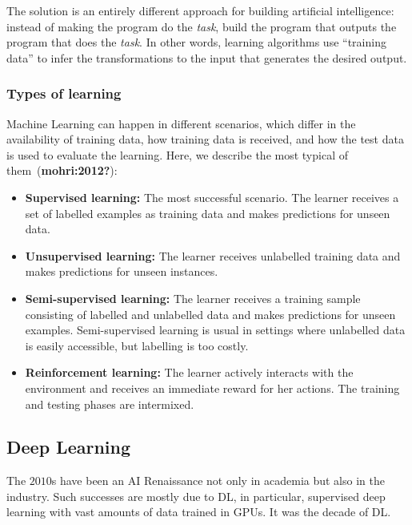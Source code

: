 \documentclass[
  letterpaper,
  DIV=11,
  numbers=noendperiod,
  oneside]{scrreprt}
\begin{document}
The solution is an entirely different approach for building artificial
intelligence: instead of making the program do the \emph{task}, build
the program that outputs the program that does the \emph{task}. In other
words, learning algorithms use ``training data'' to infer the
transformations to the input that generates the desired output.

\hypertarget{types-of-learning}{%
\subsubsection{Types of learning}\label{types-of-learning}}

Machine Learning can happen in different scenarios, which differ in the
availability of training data, how training data is received, and how
the test data is used to evaluate the learning. Here, we describe the
most typical of them~(\textbf{mohri:2012?}):

\begin{itemize}
\item
  \textbf{Supervised learning:} The most successful scenario. The
  learner receives a set of labelled examples as training data and makes
  predictions for unseen data.
\item
  \textbf{Unsupervised learning:} The learner receives unlabelled
  training data and makes predictions for unseen instances.
\item
  \textbf{Semi-supervised learning:} The learner receives a training
  sample consisting of labelled and unlabelled data and makes
  predictions for unseen examples. Semi-supervised learning is usual in
  settings where unlabelled data is easily accessible, but labelling is
  too costly.
\item
  \textbf{Reinforcement learning:} The learner actively interacts with
  the environment and receives an immediate reward for her actions. The
  training and testing phases are intermixed.
\end{itemize}

\hypertarget{deep-learning}{%
\subsection{Deep Learning}\label{deep-learning}}

The \(2010\)s have been an AI Renaissance not only in academia but also
in the industry. Such successes are mostly due to {DL}, in particular,
supervised deep learning with vast amounts of data trained in {GPUs}. It
was the decade of {DL}.
\end{document}
